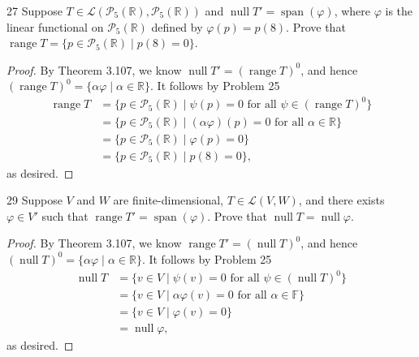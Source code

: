 \documentclass{extarticle}
\newenvironment{problem}[1]{\begin{prob*}{#1}{}}{\end{prob*}}
\newcommand{\R}{\mathbb{R}}
\newcommand{\F}{\mathbb{F}}
\newcommand{\poly}{\mathcal{P}}
\DeclareMathOperator{\Span}{span}
\newcommand{\Hom}{\mathcal{L}}
\DeclareMathOperator{\Null}{null}
\DeclareMathOperator{\Range}{range}
\begin{document}
\begin{problem}{27}
Suppose $T\in\Hom(\poly_5(\R), \poly_5(\R))$ and $\Null T'=\Span(\varphi)$, where $\varphi$ is the linear functional on $\poly_5(\R)$ defined by $\varphi(p) = p(8)$.  Prove that $\Range T=\{p\in\poly_5(\R)\mid p(8) = 0\}$.  
\end{problem}
\begin{proof}
By Theorem 3.107, we know $\Null T'=(\Range T)^0$, and hence $(\Range T)^0 = \{\alpha \varphi\mid \alpha\in\R\}$.  It follows by Problem 25
\begin{align*}
\Range T &= \{p\in \poly_5(\R)\mid \psi(p) =0\text{ for all }\psi\in (\Range T)^0\}\\
&= \{p\in \poly_5(\R)\mid (\alpha\varphi)(p) = 0 \text{ for all }\alpha\in\R\}\\
&= \{p\in \poly_5(\R)\mid \varphi(p) = 0 \}\\
&= \{p\in \poly_5(\R)\mid p(8) =0\},
\end{align*}
as desired.
\end{proof}

\begin{problem}{29}
Suppose $V$ and $W$ are finite-dimensional, $T\in\Hom(V,W)$, and there exists $\varphi\in V'$ such that $\Range T' = \Span(\varphi)$.  Prove that $\Null T = \Null \varphi$.  
\end{problem}
\begin{proof}
By Theorem 3.107, we know $\Range T'=(\Null T)^0$, and hence $(\Null T)^0 = \{\alpha \varphi\mid \alpha\in\R\}$.  It follows by Problem 25
\begin{align*}
\Null T &= \{v\in V\mid \psi(v) = 0\text{ for all }\psi\in(\Null T)^0\}\\
&= \{v\in V\mid \alpha\varphi(v) = 0 \text{ for all }\alpha\in \F\}\\
&= \{v \in V\mid \varphi(v) =0\}\\
&= \Null\varphi,
\end{align*}
as desired.
\end{proof}
\end{document}

